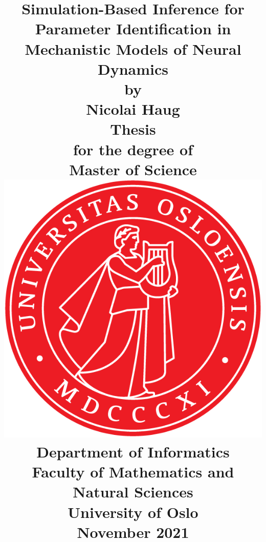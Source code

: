 
\title{
    \Large \textbf{Simulation-Based Inference for Parameter Identification in Mechanistic Models of Neural Dynamics}
    \\[8 pt]
    \large by
    \\ [8 pt]
    \large Nicolai Haug
    \\ [40 pt]
    \large \textbf{Thesis}
    \\ [8 pt]
    \large for the degree of
    \\ [8 pt]
    \large \textbf{Master of Science}
    \\ [30 pt]
    \includegraphics[scale=0.9]{latex/latex-report/3_Images/Logo/UiO/UiO_Segl_300dpi.png}
    \\ [30 pt]
    \large Department of Informatics
    \\ [8 pt]
    \large Faculty of Mathematics and Natural Sciences
    \\ [8 pt]
    \large University of Oslo
    \\ [15 pt]
    \large November 2021
}%

\author{\vspace{-5ex}}
\date{\vspace{-5ex}}


\maketitle

\restoregeometry